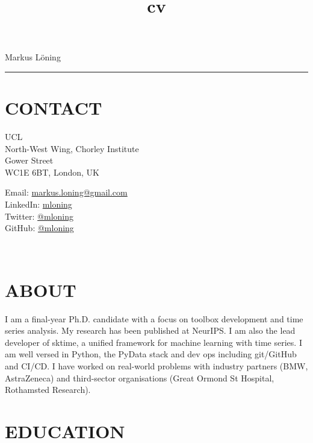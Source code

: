 \documentclass{cv}
\title{cv}
\begin{document}
{\LARGE Markus Löning}
\vspace{12pt}
\hrule

\section{CONTACT}

\begin{minipage}{.44\textwidth}
\vspace{3pt}
{\raggedright{} UCL \\
North-West Wing, Chorley Institute \\
Gower Street \\
WC1E 6BT, London, UK}
\end{minipage}
\hspace{1.25cm}
\begin{minipage}{.44\textwidth}
\vspace{3pt}
Email: \href{mailto:markus.loning@gmail.com}{markus.loning@gmail.com} \\
LinkedIn: \href{https://linkedin.com/in/mloning}{mloning} \\
Twitter: \href{https://twitter.com/mloning_}{@mloning\textunderscore} \\
GitHub: \href{https://github.com/mloning}{@mloning}
\end{minipage}
\\

\section{ABOUT}

I am a final-year Ph.D. candidate with a focus on toolbox development and time series analysis. My research has been published at NeurIPS. I am also the lead developer of sktime, a unified framework for machine learning with time series. I am well versed in Python, the PyData stack and dev ops including git/GitHub and CI/CD. I have worked on real-world problems with industry partners (BMW, AstraZeneca) and third-sector organisations (Great Ormond St Hospital, Rothamsted Research).

\section{EDUCATION}
\end{document}
